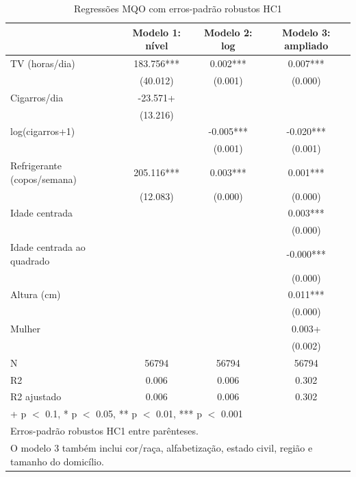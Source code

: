 \begin{table}
\centering
\caption{Regressões MQO com erros-padrão robustos HC1}
\centering
\begin{tabular}[t]{lccc}
\toprule
  & Modelo 1: nível & Modelo 2: log & Modelo 3: ampliado\\
\midrule
TV (horas/dia) & 183.756*** & 0.002*** & 0.007***\\
 & (40.012) & (0.001) & (0.000)\\
Cigarros/dia & -23.571+ &  & \\
 & (13.216) &  & \\
log(cigarros+1) &  & -0.005*** & -0.020***\\
 &  & (0.001) & (0.001)\\
Refrigerante (copos/semana) & 205.116*** & 0.003*** & 0.001***\\
 & (12.083) & (0.000) & (0.000)\\
Idade centrada &  &  & 0.003***\\
 &  &  & \vphantom{2} (0.000)\\
Idade centrada ao quadrado &  &  & -0.000***\\
 &  &  & \vphantom{1} (0.000)\\
Altura (cm) &  &  & 0.011***\\
 &  &  & (0.000)\\
Mulher &  &  & 0.003+\\
 &  &  & (0.002)\\
\midrule
N & 56794 & 56794 & 56794\\
R2 & 0.006 & 0.006 & 0.302\\
R2 ajustado & 0.006 & 0.006 & 0.302\\
\bottomrule
\multicolumn{4}{l}{\rule{0pt}{1em}+ p $<$ 0.1, * p $<$ 0.05, ** p $<$ 0.01, *** p $<$ 0.001}\\
\multicolumn{4}{l}{\rule{0pt}{1em}Erros-padrão robustos HC1 entre parênteses.}\\
\multicolumn{4}{l}{\rule{0pt}{1em}O modelo 3 também inclui cor/raça, alfabetização, estado civil, região e tamanho do domicílio.}\\
\end{tabular}
\end{table}
